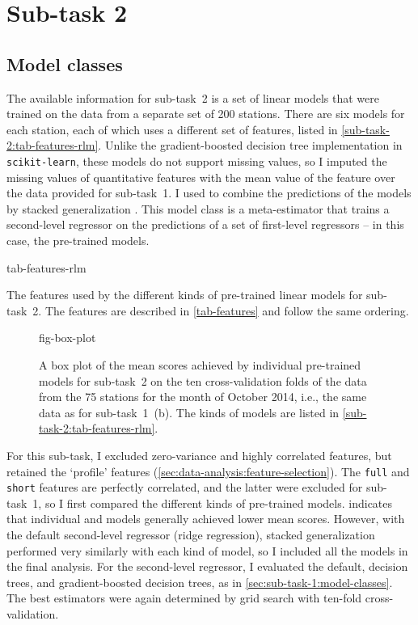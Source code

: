 
\section{Sub-task 2}
\label{sec:sub-task-2}

\subsection{Model classes}
\label{sec:sub-task-2:model-classes}

The available information for sub-task~2 is a set of linear models that were trained on
the data from a separate set of 200 stations.
There are six models for each station, each of which uses a different set of features,
listed in \cref{sub-task-2:tab-features-rlm}.
Unlike the gradient-boosted decision tree implementation in \texttt{scikit-learn},
these models do not support missing values, so I imputed the missing values of
quantitative features with the mean value of the feature over the data provided for
sub-task~1.
I used  to combine the predictions of the models
by stacked generalization \parencite{Wolpert1992}.
This model class is a meta-estimator that trains a second-level regressor on the
predictions of a set of first-level regressors -- in this case, the pre-trained models.

\begin{table}
  \centering
  {tab-features-rlm}
  \caption{
    The features used by the different kinds of pre-trained linear models for sub-task~2.
    The features are described in \cref{tab-features} and follow the same ordering.
  }
  \label{sub-task-2:tab-features-rlm}
\end{table}

\begin{figure}
  \centering
  {fig-box-plot}
  \caption{
    A box plot of the mean scores achieved by individual pre-trained models for
    sub-task~2 on the ten cross-validation folds of the data from the 75 stations for
    the month of October 2014, i.e., the same data as for sub-task~1~(b).
    The kinds of models are listed in \cref{sub-task-2:tab-features-rlm}.
  }
  \label{sub-task-2:fig-box-plot}
\end{figure}

For this sub-task, I excluded zero-variance and highly correlated features, but
retained the `profile' features (\cref{sec:data-analysis:feature-selection}).
The \texttt{full} and \texttt{short} features are perfectly correlated, and the latter
were excluded for sub-task~1, so I first compared the different kinds of pre-trained
models.
 indicates that individual \rlmshort{} and \rlmshorttemp{} models
generally achieved lower mean scores.
However, with the default second-level regressor (ridge regression), stacked
generalization performed very similarly with each kind of model, so I included all the
models in the final analysis.
For the second-level regressor, I evaluated the default, decision trees, and
gradient-boosted decision trees, as in \cref{sec:sub-task-1:model-classes}.
The best estimators were again determined by grid search with ten-fold
cross-validation.

